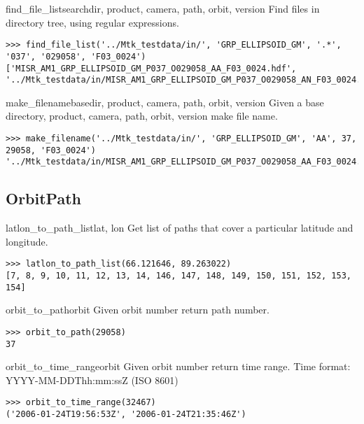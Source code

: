 \documentclass{howto}
\begin{document}
\begin{funcdesc}{find_file_list}{searchdir, product, camera, path, orbit, version}
  Find files in directory tree, using regular expressions.

\begin{verbatim}
>>> find_file_list('../Mtk_testdata/in/', 'GRP_ELLIPSOID_GM', '.*', '037', '029058', 'F03_0024')
['MISR_AM1_GRP_ELLIPSOID_GM_P037_O029058_AA_F03_0024.hdf', '../Mtk_testdata/in/MISR_AM1_GRP_ELLIPSOID_GM_P037_O029058_AN_F03_0024.hdf']
\end{verbatim}
\end{funcdesc}

\begin{funcdesc}{make_filename}{basedir, product, camera, path, orbit, version}
  Given a base directory, product, camera, path, orbit, version make file name.

\begin{verbatim}
>>> make_filename('../Mtk_testdata/in/', 'GRP_ELLIPSOID_GM', 'AA', 37, 29058, 'F03_0024')
'../Mtk_testdata/in/MISR_AM1_GRP_ELLIPSOID_GM_P037_O029058_AA_F03_0024.hdf'
\end{verbatim}
\end{funcdesc}

\subsection{OrbitPath \label{orbitpath}}

\begin{funcdesc}{latlon_to_path_list}{lat, lon}
  Get list of paths that cover a particular latitude and longitude.

\begin{verbatim}
>>> latlon_to_path_list(66.121646, 89.263022)
[7, 8, 9, 10, 11, 12, 13, 14, 146, 147, 148, 149, 150, 151, 152, 153, 154]
\end{verbatim}
\end{funcdesc}

\begin{funcdesc}{orbit_to_path}{orbit}
  Given orbit number return path number.

\begin{verbatim}
>>> orbit_to_path(29058)
37
\end{verbatim}
\end{funcdesc}

\begin{funcdesc}{orbit_to_time_range}{orbit}
  Given orbit number return time range.  Time format: YYYY-MM-DDThh:mm:ssZ (ISO 8601)

\begin{verbatim}
>>> orbit_to_time_range(32467)
('2006-01-24T19:56:53Z', '2006-01-24T21:35:46Z')
\end{verbatim}
\end{funcdesc}
\end{document}
